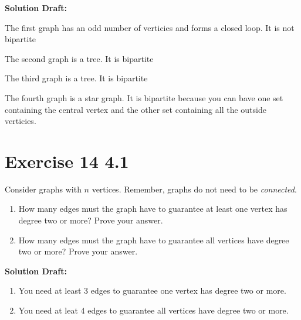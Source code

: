 \documentclass{article}
\begin{document}
\vspace{0.5cm}
\noindent\textbf{Solution Draft:} 
\vspace{0.2cm}

The first graph has an odd number of verticies and forms a closed loop. It is not bipartite

The second graph is a tree. It is bipartite

The third graph is a tree. It is bipartite

The fourth graph is a star graph. It is bipartite because you can bave one set containing the central vertex and the other set containing all the outside verticies.



\section*{Exercise 14 4.1}  

Consider graphs with \(n\) vertices.  Remember, graphs do not need to be \emph{connected}.%
\begin{enumerate}[label= (\alph*)]
\item{}How many edges must the graph have to guarantee at least one vertex has degree two or more?  Prove your answer.%
\item{}How many edges must the graph have to guarantee all vertices have degree two or more?  Prove your answer.%
\end{enumerate}

\vspace{0.5cm}
\noindent\textbf{Solution Draft:} 
\vspace{0.2cm}

\begin{enumerate}[label= (\alph*)]
    \item You need at least 3 edges to guarantee one vertex has degree two or more.
    
    \item You need at leat 4 edges to guarantee all vertices have degree two or more.
    
\end{enumerate}
\end{document}
